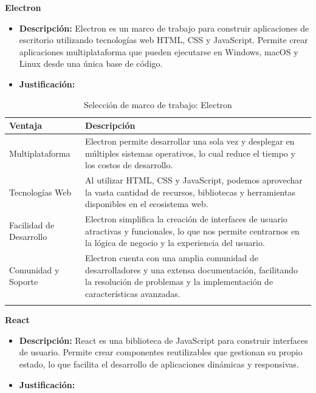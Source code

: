 \textbf{Electron}
\begin{itemize}[label={}, leftmargin=0pt]
    \item \textbf{Descripción:} Electron es un marco de trabajo para construir aplicaciones de escritorio utilizando tecnologías web HTML, CSS y JavaScript. Permite crear aplicaciones multiplataforma que pueden ejecutarse en Windows, macOS y Linux desde una única base de código.
    \item \textbf{Justificación:}
\end{itemize}

\begin{longtable}{|p{3cm}|p{10cm}|}
\hline
\textbf{Ventaja} & \textbf{Descripción} \\ \hline
Multiplataforma & Electron permite desarrollar una sola vez y desplegar en múltiples sistemas operativos, lo cual reduce el tiempo y los costos de desarrollo. \\ \hline
Tecnologías Web & Al utilizar HTML, CSS y JavaScript, podemos aprovechar la vasta cantidad de recursos, bibliotecas y herramientas disponibles en el ecosistema web. \\ \hline
Facilidad de Desarrollo & Electron simplifica la creación de interfaces de usuario atractivas y funcionales, lo que nos permite centrarnos en la lógica de negocio y la experiencia del usuario. \\ \hline
Comunidad y Soporte & Electron cuenta con una amplia comunidad de desarrolladores y una extensa documentación, facilitando la resolución de problemas y la implementación de características avanzadas. \\ \hline
\caption{Selección de marco de trabajo: Electron}
\end{longtable}

\textbf{React}
\begin{itemize}[label={}, leftmargin=0pt]
    \item \textbf{Descripción:} React es una biblioteca de JavaScript para construir interfaces de usuario. Permite crear componentes reutilizables que gestionan su propio estado, lo que facilita el desarrollo de aplicaciones dinámicas y responsivas.
    \item \textbf{Justificación:}
\end{itemize}

